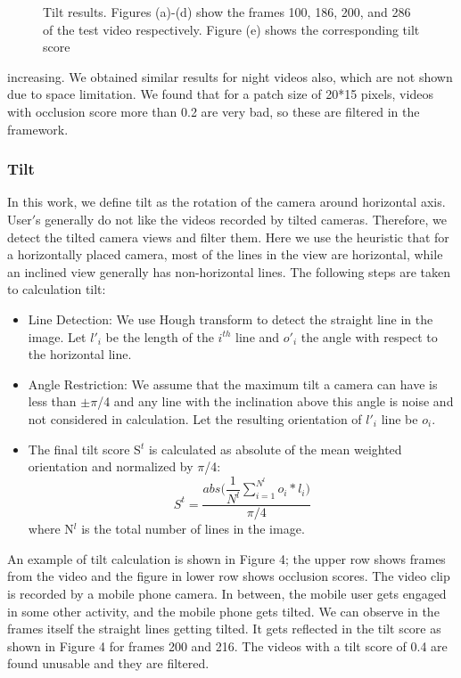 \documentclass{sig-alternate-05-2015}
\begin{document}
\begin{itemize}
\begin{figure}
\caption{Tilt results. Figures (a)-(d) show the frames 100, 186,
200, and 286 of the test video respectively. Figure (e) shows the
corresponding tilt score}
\end{figure}
increasing. We obtained similar results for night videos
also, which are not shown due to space limitation. We found that
for a patch size of 20*15 pixels, videos with occlusion score more
than 0.2 are very bad, so these are filtered in the framework.
 \end{itemize} 
\subsubsection{Tilt}
In this work, we define tilt as the rotation of the camera around
horizontal axis. User$'$s generally do not like the videos recorded
by tilted cameras. Therefore, we detect the tilted camera views
and filter them. Here we use the heuristic that for a horizontally
placed camera, most of the lines in the view are horizontal, while
an inclined view generally has non-horizontal lines. The following
steps are taken to calculation tilt:
 \begin{itemize} 
    \item Line Detection: We use Hough transform to detect the straight
line in the image. Let $l'_i$ be the length of the $i^{th}$ line and $o'_i$
the angle with respect to the horizontal line.
    \item  Angle Restriction: We assume that the maximum tilt a camera can have is less than $\pm\pi$/4 and any line with the inclination above this angle is noise and not considered in calculation. Let the resulting orientation of $l'_i$ line be $o_i$.
    \item The final tilt score S$^t$ is calculated as absolute of the mean
weighted orientation and normalized by $\pi$/4:
\begin{equation}
    S^t=\dfrac{abs\bigg(\dfrac{1}{N^l}\sum_{i=1}^{N^l} o_i*l_i\bigg)}{\pi/4}
\end{equation}
where N$^l$ is the total number of lines in the image.
 \end{itemize} \par
An example of tilt calculation is shown in Figure 4; the upper
row shows frames from the video and the figure in lower row shows
occlusion scores. The video clip is recorded by a mobile phone
camera. In between, the mobile user gets engaged in some other
activity, and the mobile phone gets tilted. We can observe in the
frames itself the straight lines getting tilted. It gets reflected in the
tilt score as shown in Figure 4 for frames 200 and 216. The videos
with a tilt score of 0.4 are found unusable and they are filtered.
\end{document}
